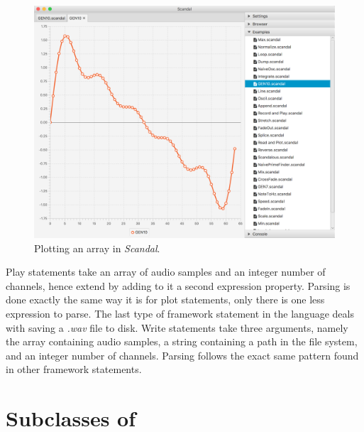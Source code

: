 \begin{figure}[b!]
	\includegraphics[width=4.5in]{img/plot}
	\caption[Plotting an array in \emph{Scandal}.]{Plotting an array in \emph{Scandal}.}
\end{figure}

\newpage Play statements take an array of audio samples and an integer number of channels, hence extend  by adding to it a second expression property. Parsing is done exactly the same way it is for plot statements, only there is one less expression to parse. The last type of framework statement in the language deals with saving a \emph{.wav} file to disk. Write statements take three arguments, namely the array containing audio samples, a string containing a path in the file system, and an integer number of channels. Parsing follows the exact same pattern found in other framework statements.

\section{Subclasses of }

